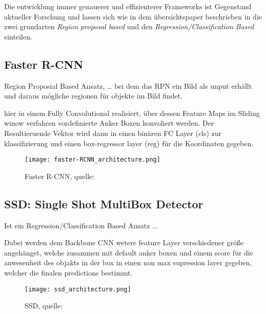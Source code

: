 Die entwicklung immer genauerer und effizienterer 
Frameworks ist Gegenstand aktueller Forschung und lassen 
sich wie in dem übersichtspaper \cite{ouaknineReviewDeepLearning}
beschrieben in die zwei grundarten \textit{Region proposal based} 
und den \textit{Regression/Classification Based} einteilen.




\subsection{Faster R-CNN}
Region Proposial Based Ansatz, \dots \cite{renFasterRCNNRealTime2016a}
bei dem das RPN ein Bild als unput erhällt und
daraus mögliche regionen für objekte im Bild findet.

hier in einem Fully Convolutional realisiert, über dessen 
Feature Maps im Sliding winow verfahren vordefinierte Anker
 Boxen konvoliert werden. Der Resultieruende Vektor wird 
 dann in einen binären FC Layer (cls) zur klassifizierung und 
einen box-regressor layer (reg) für die Koordinaten gegeben.


\begin{figure}[H]
    \centering
    \label{fig:faster_rcnn}
    \texttt{[image: faster-RCNN\_architecture.png]}
    \caption{Faster R-CNN, quelle: \cite{ObjectDetectionDummies2017b}}
\end{figure}



\subsection{SSD: Single Shot MultiBox Detector}
Ist ein Regression/Classification Based Ansatz ... \cite{liuSSDSingleShot2016}

Dabei werden dem Backbone CNN wetere feature Layer verschiedener größe 
angehänget, welche zusammen mit default anker boxen und einem score 
für die anwesenheit des objakts in der box in einen non max supression 
layer gegeben, welcher die finalen predictions bestimmt.


\begin{figure}[H]
    \centering
    \label{fig:faster_rcnn}
    \texttt{[image: ssd\_architecture.png]}
    \caption{SSD, quelle: \cite{SSDSingleShot}}
\end{figure}

